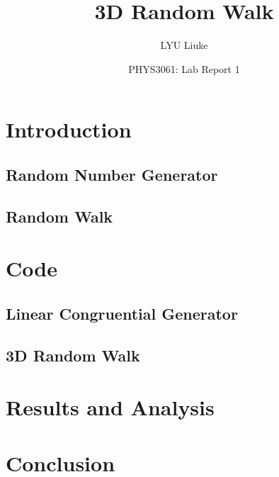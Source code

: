 \documentclass{article}
\title{3D Random Walk}
\author{LYU Liuke}
\date{PHYS3061: Lab Report 1}
\begin{document}
\maketitle
\tableofcontents

\section{Introduction}

\subsection{Random Number Generator}

\subsection{Random Walk}

\section{Code}

\subsection{Linear Congruential Generator}

\subsection{3D Random Walk}

\section{Results and Analysis}

\section{Conclusion}
\end{document}
